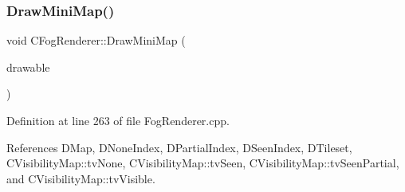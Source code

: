 \subsubsection{\texorpdfstring{Draw\+Mini\+Map()}{DrawMiniMap()}}
{\footnotesize\ttfamily void C\+Fog\+Renderer\+::\+Draw\+Mini\+Map (\begin{DoxyParamCaption}\item[{Gdk\+Drawable $\ast$}]{drawable }\end{DoxyParamCaption})}



Definition at line 263 of file Fog\+Renderer.\+cpp.



References D\+Map, D\+None\+Index, D\+Partial\+Index, D\+Seen\+Index, D\+Tileset, C\+Visibility\+Map\+::tv\+None, C\+Visibility\+Map\+::tv\+Seen, C\+Visibility\+Map\+::tv\+Seen\+Partial, and C\+Visibility\+Map\+::tv\+Visible.


